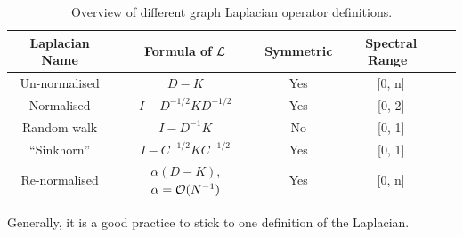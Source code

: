 \begin{table}[!htbp]
 \centering
 \begin{tabular}{|c|c|c|c|c|}
  \hline
  Laplacian Name & Formula of \(\operatorname{\mathcal{L}}\) & Symmetric & Spectral Range \\
  \hline
  Un-normalised & \(D - K\) & Yes & [0, n] \\
  \hline
  Normalised & \(I - D^{-1/2}KD^{-1/2}\) & Yes & [0, 2] \\
  \hline
  Random walk & \(I - D^{-1}K\) & No & [0, 1] \\
  \hline
  ``Sinkhorn'' \cite{milanfar_symmetrizing_2013} & \(I - C^{-1/2}KC^{-1/2}\) & Yes & [0, 1] \\
  \hline
  Re-normalised \cite{milanfar_new_2016} & \(\alpha(D - K)\), \(\alpha = \operatorname{\mathcal{O}}(N^{-1})\) & Yes & [0, n] \\
  \hline
 \end{tabular}
 \caption{Overview of different graph Laplacian operator definitions.}
 \label{table:laplacians}
\end{table}
Generally, it is a good practice to stick to one definition of the Laplacian.

